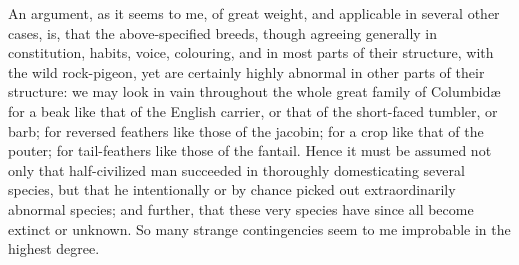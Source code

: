 \documentclass{book}
\begin{document}
An argument, as it seems to me, of great weight, and applicable in several
other cases, is, that the above-specified breeds, though agreeing generally in
constitution, habits, voice, colouring, and in most parts of their structure,
with the wild rock-pigeon, yet are certainly highly abnormal in other parts of
their structure: we may look in vain throughout the whole great family of
Columbidæ for a beak like that of the English carrier, or that of the
short-faced tumbler, or barb; for reversed feathers like those of the jacobin;
for a crop like that of the pouter; for tail-feathers like those of the
fantail. Hence it must be assumed not only that half-civilized man succeeded in
thoroughly domesticating several species, but that he intentionally or by
chance picked out extraordinarily abnormal species; and further, that these
very species have since all become extinct or unknown. So many strange
contingencies seem to me improbable in the highest degree.
\end{document}
